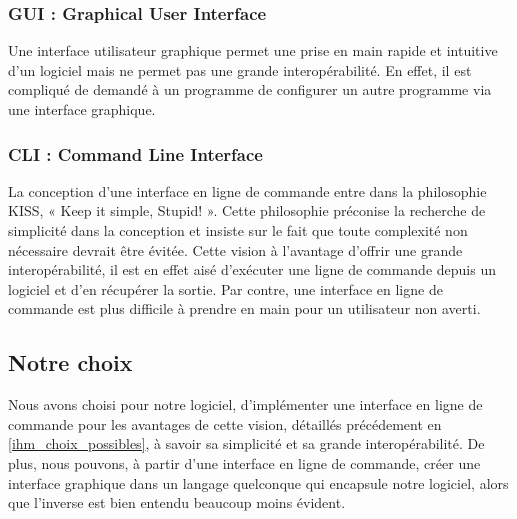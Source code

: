 		\subsubsection{GUI : \og Graphical User Interface \fg{}}
			Une interface utilisateur graphique permet une prise en main rapide et intuitive d'un logiciel mais ne permet pas une grande interopérabilité. En effet, il est compliqué de demandé à un programme de configurer un autre programme via une interface graphique.
			
		\subsubsection{CLI : \og Command Line Interface \fg{}}
			La conception d'une interface en ligne de commande entre dans la philosophie KISS, « Keep it simple, Stupid! ». Cette philosophie préconise la recherche de simplicité dans la conception et insiste sur le fait que toute complexité non nécessaire devrait être évitée. Cette vision à l'avantage d'offrir une grande interopérabilité, il est en effet aisé d'exécuter une ligne de commande depuis un logiciel et d'en récupérer la sortie. Par contre, une interface en ligne de commande est plus difficile à prendre en main pour un utilisateur non averti.  
			
	\subsection{Notre choix}
		Nous avons choisi pour notre logiciel, d'implémenter une interface en ligne de commande pour les avantages de cette vision, détaillés précédement en \ref{ihm_choix_possibles}, à savoir sa simplicité et sa grande interopérabilité. De plus, nous pouvons, à partir d'une interface en ligne de commande, créer une interface graphique dans un langage quelconque qui encapsule notre logiciel, alors que l'inverse est bien entendu beaucoup moins évident.
